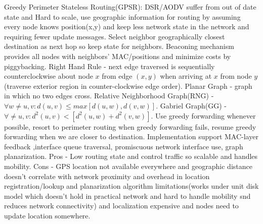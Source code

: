 \documentclass[9pt]{extarticle}
\begin{document}
\begin{multicols}{2}
Greedy Perimeter Stateless Routing(GPSR): DSR/AODV suffer from out of date state and Hard to scale, use geographic information for routing by assuming every node knows position(x,y) and keep less network state in the network and requiring fewer update messages. Select neighbor geographically closest destination as next hop so keep state for neighbors. Beaconing mechanism provides all nodes with neighbors’ MAC/positions and minimize costs by piggybacking. Right Hand Rule - next edge traversed is sequentially counterclockwise about node $x$ from edge $(x,y)$ when arriving at $x$ from node $y$(traverse exterior region in counter-clockwise edge order). Planar Graph - graph in which no two edges cross. Relative Neighborhood Graph(RNG) - $\forall{w\neq{u,v}}: d(u,v)\leq{max[d(u,w),d(v,w)]}$. Gabriel Graph(GG) - $\forall{\neq{u,v}}:d^2(u,v)<[d^2(u,w) + d^2(v,w)]$. Use greedy forwarding whenever possible, resort to perimeter routing when greedy forwarding fails, resume greedy forwarding when we are closer to destination. Implementation support MAC-layer feedback ,interface queue traversal, promiscuous network interface use, graph planarization. Pros - Low routing state and control traffic so scalable and handles mobility. Cons - GPS location not available everywhere and geographic distance doesn't correlate with network proximity and overhead in location registration/lookup and planarization algorithm limitations(works under unit disk model which doesn’t hold in practical network and hard to handle mobility snd reduces network connectivity) and localization expensive and nodes need to update location somewhere.


\end{multicols}
\end{document}
